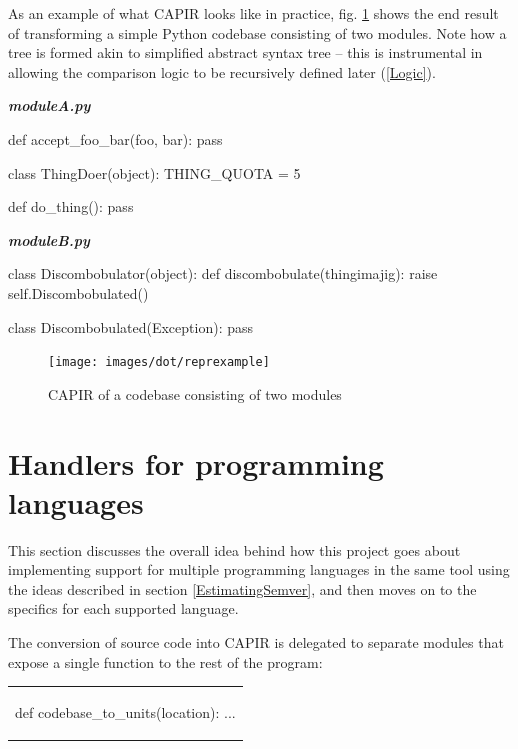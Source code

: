 \documentclass{l4proj}
\newenvironment{halfmini}[1]
{
\begin{minipage}[t]{0.5\textwidth}
\noindent\textbf{\textit{#1}}\\
}
{
\end{minipage}
}
\begin{document}
\clearpage
As an example of what CAPIR looks like in practice, fig.
\ref{RepresentationExample} shows the end result of transforming a
simple Python codebase consisting of two modules. Note how a tree is
formed akin to simplified abstract syntax tree -- this is instrumental
in allowing the comparison logic to be recursively defined later
(\ref{Logic}).

\begin{halfmini}{moduleA.py}
\begin{python}
def accept_foo_bar(foo, bar):
    pass

class ThingDoer(object):
    THING_QUOTA = 5

    def do_thing():
        pass
\end{python}
\end{halfmini}
\begin{halfmini}{moduleB.py}
\begin{python}
class Discombobulator(object):
    def discombobulate(thingimajig):
        raise self.Discombobulated()

    class Discombobulated(Exception):
        pass
\end{python}
\end{halfmini}

\begin{figure}[H]
\centering
\texttt{[image: images/dot/reprexample]}
\caption{CAPIR of a codebase consisting of two modules}
\label{RepresentationExample}
\end{figure}
\clearpage

\section{Handlers for programming languages}
\label{LanguageHandlers}

This section discusses the overall idea behind how this project goes
about implementing support for multiple programming languages in the
same tool using the ideas described in section \ref{EstimatingSemver},
and then moves on to the specifics for each supported language.

The conversion of source code into CAPIR is delegated to separate
modules that expose a single function to the rest of the program:

\begin{center}
\begin{tabular}{c}
\begin{python}
def codebase_to_units(location):
    ...
\end{python}
\end{tabular}
\end{center}
\end{document}
